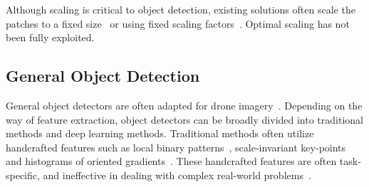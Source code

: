 \documentclass[letterpaper]{article} %
\newcommand\blue[1]{\textcolor{blue}{#1}}
\newcommand\rjf[1]{\textcolor{red}{\{RJF: #1\}}}
\begin{document}
Although scaling is critical to object detection, existing solutions often scale the patches to a fixed size~\cite{Xu_2022_AdaZoom} or using fixed scaling factors~\cite{Huang_2022_UFPMP}. Optimal scaling has not been fully exploited.

\subsection{General Object Detection}
General object detectors are often adapted for drone imagery~\cite{Cai_2018_Cascade}. %
Depending on the way of feature extraction, object detectors can be broadly divided into traditional methods and deep learning methods. Traditional methods often utilize handcrafted features such as local binary patterns~\cite{Ren_2015_LBPVisualRecognition}, scale-invariant key-points~\cite{Lowe_2004_SIFT} and histograms of oriented gradients~\cite{Dalal_2005_HOG}. %
These handcrafted features are often task-specific, and ineffective in dealing with complex real-world problems~\cite{Bouguettaya_2022_review}.
\end{document}
